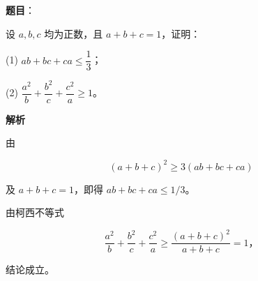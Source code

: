 \begin{answer}

\textbf{题目}：

设 $a,b,c$ 均为正数，且 $a+b+c=1$，证明：

(1) $ab+bc+ca\leqslant\dfrac13$；

(2) $\dfrac{a^2}{b}+\dfrac{b^2}{c}+\dfrac{c^2}{a}\geqslant1$。

\textbf{解析}


由

\nopagebreak[4]
\[ (a+b+c)^2\geqslant3(ab+bc+ca) \]

及 $a+b+c=1$，即得 $ab+bc+ca\leqslant1/3$。


由柯西不等式

\nopagebreak[4]
\[\frac{a^2}{b}+\frac{b^2}{c}+\frac{c^2}{a}\geqslant\frac{(a+b+c)^2}{a+b+c}=1\text{，}\]

结论成立。



\end{answer}